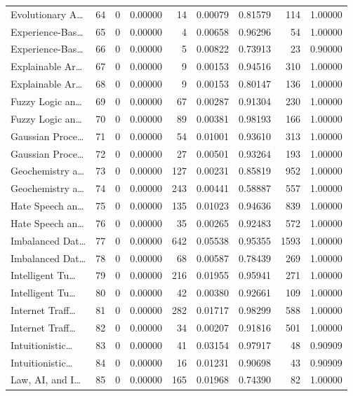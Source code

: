 \begin{table}
\begin{tabular}{lrrrrrrrr}
Evolutionary A… & 64 & 0 & 0.00000 & 14 & 0.00079 & 0.81579 & 114 & 1.00000 \\
Experience-Bas… & 65 & 0 & 0.00000 & 4 & 0.00658 & 0.96296 & 54 & 1.00000 \\
Experience-Bas… & 66 & 0 & 0.00000 & 5 & 0.00822 & 0.73913 & 23 & 0.90000 \\
Explainable Ar… & 67 & 0 & 0.00000 & 9 & 0.00153 & 0.94516 & 310 & 1.00000 \\
Explainable Ar… & 68 & 0 & 0.00000 & 9 & 0.00153 & 0.80147 & 136 & 1.00000 \\
Fuzzy Logic an… & 69 & 0 & 0.00000 & 67 & 0.00287 & 0.91304 & 230 & 1.00000 \\
Fuzzy Logic an… & 70 & 0 & 0.00000 & 89 & 0.00381 & 0.98193 & 166 & 1.00000 \\
Gaussian Proce… & 71 & 0 & 0.00000 & 54 & 0.01001 & 0.93610 & 313 & 1.00000 \\
Gaussian Proce… & 72 & 0 & 0.00000 & 27 & 0.00501 & 0.93264 & 193 & 1.00000 \\
Geochemistry a… & 73 & 0 & 0.00000 & 127 & 0.00231 & 0.85819 & 952 & 1.00000 \\
Geochemistry a… & 74 & 0 & 0.00000 & 243 & 0.00441 & 0.58887 & 557 & 1.00000 \\
Hate Speech an… & 75 & 0 & 0.00000 & 135 & 0.01023 & 0.94636 & 839 & 1.00000 \\
Hate Speech an… & 76 & 0 & 0.00000 & 35 & 0.00265 & 0.92483 & 572 & 1.00000 \\
Imbalanced Dat… & 77 & 0 & 0.00000 & 642 & 0.05538 & 0.95355 & 1593 & 1.00000 \\
Imbalanced Dat… & 78 & 0 & 0.00000 & 68 & 0.00587 & 0.78439 & 269 & 1.00000 \\
Intelligent Tu… & 79 & 0 & 0.00000 & 216 & 0.01955 & 0.95941 & 271 & 1.00000 \\
Intelligent Tu… & 80 & 0 & 0.00000 & 42 & 0.00380 & 0.92661 & 109 & 1.00000 \\
Internet Traff… & 81 & 0 & 0.00000 & 282 & 0.01717 & 0.98299 & 588 & 1.00000 \\
Internet Traff… & 82 & 0 & 0.00000 & 34 & 0.00207 & 0.91816 & 501 & 1.00000 \\
Intuitionistic… & 83 & 0 & 0.00000 & 41 & 0.03154 & 0.97917 & 48 & 0.90909 \\
Intuitionistic… & 84 & 0 & 0.00000 & 16 & 0.01231 & 0.90698 & 43 & 0.90909 \\
Law, AI, and I… & 85 & 0 & 0.00000 & 165 & 0.01968 & 0.74390 & 82 & 1.00000 \\

\end{tabular}
\end{table}
